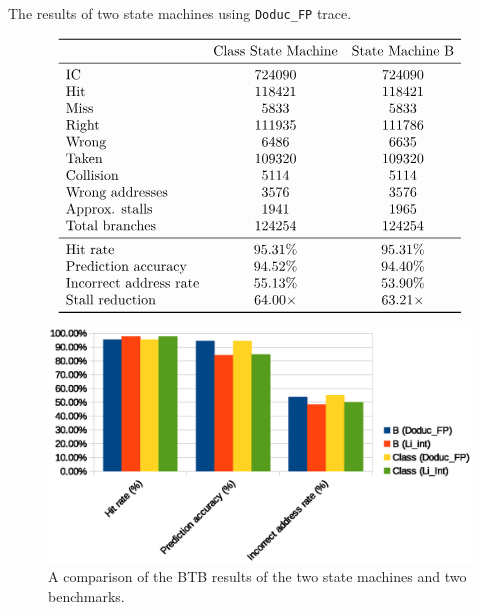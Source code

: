 \documentclass{article}
\begin{document}
		\begin{table}[p]
			\caption{The results of two state machines using \texttt{Doduc\_FP} trace.}
			\label{table:stats2}
			$$\begin{array}{lcc}
				\toprule
				& \text{Class State Machine} & \text{State Machine B} \\
				\midrule
					\text{IC}                     & 724090  & 724090  \\
					\text{Hit}                    & 118421  & 118421  \\
					\text{Miss}                   & 5833    & 5833    \\
					\text{Right}                  & 111935  & 111786  \\
					\text{Wrong}                  & 6486    & 6635    \\
					\text{Taken}                  & 109320  & 109320  \\
					\text{Collision}              & 5114    & 5114    \\
					\text{Wrong addresses}        & 3576    & 3576    \\
					\text{Approx. stalls} & 1941 & 1965 \\
					\text{Total branches} & 124254 & 124254 \\
					\midrule
					\text{Hit rate}               & 95.31\% & 95.31\% \\
					\text{Prediction accuracy}    & 94.52\% & 94.40\% \\
					\text{Incorrect address rate} & 55.13\% & 53.90\% \\
					\text{Stall reduction} & 64.00 \times & 63.21 \times \\
				\bottomrule
			\end{array}$$
		\end{table}
	\begin{figure}[h]
		\centering
		\includegraphics[width=0.7\linewidth]{grapheps}
		\caption{A comparison of the BTB results of the two state machines and two benchmarks.}
		\label{fig:graph}
	\end{figure}
	
\end{document}
